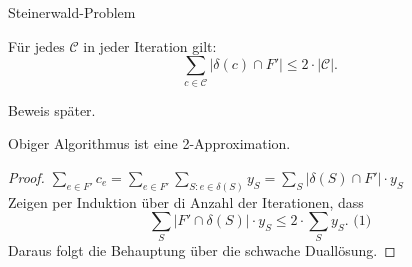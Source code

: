 \begin{section}{Steinerwald-Problem}
 \begin{lemma}[13.1]
  Für jedes $\mathcal{C}$ in jeder Iteration gilt:
  \[\sum_{c\in\mathcal{C}} |\delta(c) \cap F'| \leq 2\cdot |\mathcal{C}|\text{.}\]
 \end{lemma}
 Beweis später.
 \begin{satz}[13.2]
  Obiger Algorithmus ist eine 2-Approximation.
 \end{satz}
 \begin{proof}
  $\sum_{e\in F'} c_e = \sum_{e\in F'} \sum_{S: e\in\delta(S)} y_S = \sum_S |\delta(S)\cap F'| \cdot y_S$\\
  Zeigen per Induktion über di Anzahl der Iterationen, dass 
  \[\sum_S |F'\cap \delta(S)| \cdot y_S \leq 2\cdot \sum_S y_S \text{.   (1)}\]
  Daraus folgt die Behauptung über die schwache Duallösung.
 \end{proof}



\end{section}